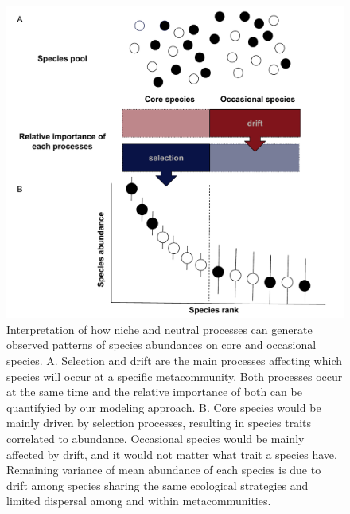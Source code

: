 \documentclass[12pt]{article}
\begin{document}
\begin{figure}[!ht]
 \begin{center}
\includegraphics[scale=.48]{fig/figura_conceitual.pdf}
\end{center}
\caption{Interpretation of how niche and neutral processes can generate observed patterns of species abundances on core and occasional species. A. Selection and drift are the main processes affecting which species will occur at a specific metacommunity. Both processes occur at the same time and the relative importance of both can be quantifyied by our modeling approach. B. Core species would be mainly driven by selection processes, resulting in species traits correlated to abundance. Occasional species would be mainly affected by drift, and it would not matter what trait a species have. Remaining variance of mean abundance of each species is due to drift among species sharing the same ecological strategies and limited dispersal among and within metacommunities.} \label{fig:final}
\end{figure}



\end{document}
